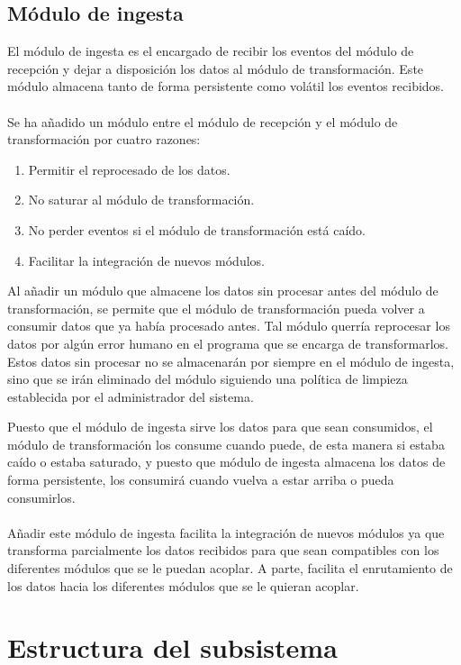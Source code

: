 \subsection{Módulo de ingesta} 

El módulo de ingesta es el encargado de recibir los eventos del módulo de recepción y dejar a disposición los datos al módulo de transformación. Este módulo almacena tanto de forma persistente como volátil los eventos recibidos.
\\\\
Se ha añadido un módulo entre el módulo de recepción y el módulo de transformación por cuatro razones:

\begin{enumerate}
	\item Permitir el reprocesado de los datos.
	\item No saturar al módulo de transformación.
	\item No perder eventos si el módulo de transformación está caído.
	\item Facilitar la integración de nuevos módulos.
\end{enumerate}

Al añadir un módulo que almacene los datos sin procesar antes del módulo de transformación, se permite que el módulo de transformación pueda volver a consumir datos que ya había procesado antes. Tal módulo querría reprocesar los datos por algún error humano en el programa que se encarga de transformarlos. Estos datos sin procesar no se almacenarán por siempre en el módulo de ingesta, sino que se irán eliminado del módulo siguiendo una política de limpieza establecida por el administrador del sistema.

Puesto que el módulo de ingesta sirve los datos para que sean consumidos, el módulo de transformación los consume cuando puede, de esta manera si estaba caído o estaba saturado, y puesto que módulo de ingesta almacena los datos de forma persistente, los consumirá cuando vuelva a estar arriba o pueda consumirlos.
\\\\
Añadir este módulo de ingesta facilita la integración de nuevos módulos ya que transforma parcialmente los datos recibidos para que sean compatibles con los diferentes módulos que se le puedan acoplar. A parte, facilita el enrutamiento de los datos hacia los diferentes módulos que se le quieran acoplar.

\section{Estructura del subsistema}

